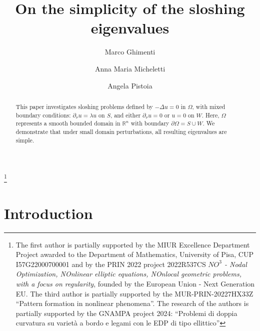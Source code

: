 \documentclass[a4paper,reqno,11pt,oneside]{amsart}
\theoremstyle{plain}
\theoremstyle{plain}
\theoremstyle{plain}
\theoremstyle{remark}
\begin{document}
\title[On the simplicity of the sloshing eigenvalues  ]{On the simplicity of the sloshing  eigenvalues}
 
\author{Marco Ghimenti}
\address[Marco Ghimenti]{Dipartimento di Matematica
Universit\`a di Pisa
Largo Bruno Pontecorvo 5, I - 56127 Pisa, Italy}

\author{Anna Maria Micheletti}
\address[Anna Maria Micheletti]{Dipartimento di Matematica
Universit\`a di Pisa
Largo Bruno Pontecorvo 5, I - 56127 Pisa, Italy}

\author{Angela Pistoia}
\address[Angela Pistoia] {Dipartimento SBAI, Universit\`{a} di Roma ``La Sapienza", via Antonio Scarpa 16, 00161 Roma, Italy}

 
\thanks{The first author is partially supported by the MIUR Excellence Department Project awarded to the Department of Mathematics, University of Pisa, CUP I57G22000700001 and by the PRIN 2022 project 2022R537CS \emph{$NO^3$ - Nodal Optimization, NOnlinear elliptic equations, NOnlocal geometric problems, with a focus on regularity}, founded by the European Union - Next Generation EU. The third author is partially supported by the MUR-PRIN-20227HX33Z ``Pattern formation in nonlinear phenomena''. 
The research of the authors is partially supported by the GNAMPA project 2024: ``Problemi di doppia
curvatura su variet\`a a bordo e legami con le EDP di tipo ellittico''}

 



\begin{abstract}
This paper investigates sloshing problems defined by $-\Delta u=0$ in $\Omega$, with mixed boundary conditions: $\partial_{\nu}u=\lambda u$ on $S$, and either $\partial_{\nu}u=0$ or $u=0$ on $W$. Here, $\Omega$ represents a smooth bounded domain in $\mathbb{R}^n$ with boundary $\partial\Omega=S \cup W$. We demonstrate that under small domain perturbations, all resulting eigenvalues are simple.
\end{abstract}


\maketitle

\section{Introduction}
\end{document}
